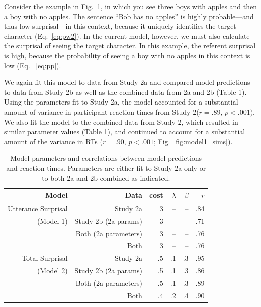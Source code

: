 \documentclass[10pt,letterpaper]{article}
\begin{document}
Consider the example in Fig.\ 1, in which you see three boys with apples and then a boy with no apples.  The sentence ``Bob has no apples'' is highly probable---and thus low surprisal---in this context, because it uniquely identifies the target character (Eq.\ \ref{eq:pw2}).  In the current model, however, we must also calculate the surprisal of seeing the target character.  In this example, the referent surprisal is high, because the probability of seeing a boy with no apples in this context is low (Eq. \ \ref{eq:pp}).  

We again fit this model to data from Study 2a and compared model predictions to data from Study 2b as well as the combined data from 2a and 2b (Table 1).  Using the parameters fit to Study 2a, the model accounted for a substantial amount of variance in participant reaction times from Study 2($r=.89$, $p<.001)$.  We also fit the model to the combined data from Study 2, which resulted in similar parameter values (Table 1), and continued to account for a substantial amount of the variance in RTs ($r=.90$, $p<.001$; Fig.\ \ref{fig:model1_sims}).   

\begin{table}[t]
\caption{\label{tab:modelcorrs} Model parameters and correlations between model predictions and reaction times.  Parameters are either fit to Study 2a only or to both 2a and 2b combined as indicated.}
\begin{center}
\small\addtolength{\tabcolsep}{-2pt}
\begin{tabular}{ r r  r  r  r  r} 
\hline
  \bf{Model} & \bf{Data} & \bf{cost} & \bf{$\lambda$} & \bf{$\beta$} & \bf{$r$}  \\ \hline        
 Utterance Surprisal  &  Study 2a  & 3 & -- & -- & .84\\     
  (Model 1)& Study 2b (2a params) & 3  & -- & -- & .71\\
  & Both (2a parameters) &  3 & -- & -- & .76 \\
  & Both & 3 &  --  &  -- & .76 \\ \hline
Total Surprisal & Study 2a & .5 & .1 & .3 & .95\\     
  (Model 2) & Study 2b (2a params) & .5  & .1 & .3 & .86\\
  & Both (2a parameters) &  .5 & .1 & .3 & .89\\
  & Both & .4 &   .2 &  .4 & .90\\ 
\hline
\end{tabular}
\end{center}
\end{table}
\end{document}
